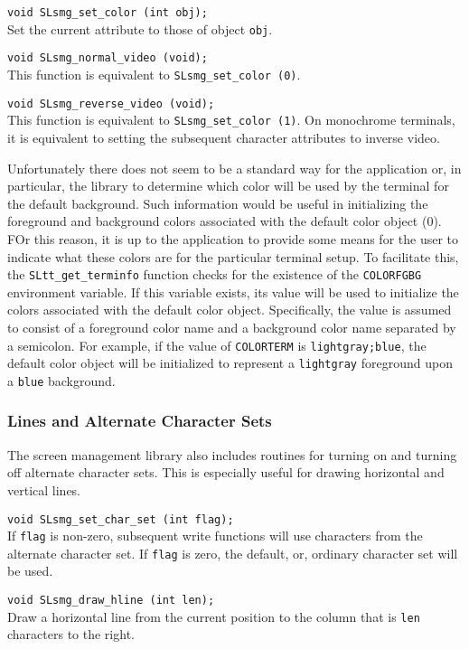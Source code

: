   \verb|void SLsmg_set_color (int obj);|\\
  Set the current attribute to those of object \verb|obj|.
  
  \verb|void SLsmg_normal_video (void);|\\
  This function is equivalent to \verb|SLsmg_set_color (0)|. 
  
  \verb|void SLsmg_reverse_video (void);|\\
  This function is equivalent to \verb|SLsmg_set_color (1)|.  On monochrome
  terminals, it is equivalent to setting the subsequent character attributes
  to inverse video.

  Unfortunately there does not seem to be a standard way for the
  application or, in particular, the library to determine which color
  will be used by the terminal for the default background.  Such
  information would be useful in initializing the foreground and
  background colors associated with the default color object (0).  FOr
  this reason, it is up to the application to provide some means for
  the user to indicate what these colors are for the particular
  terminal setup. To facilitate this, the \verb|SLtt_get_terminfo|
  function checks for the existence of the \verb|COLORFGBG|
  environment variable.  If this variable exists, its value will be
  used to initialize the colors associated with the default color
  object.  Specifically, the value is assumed to consist of a
  foreground color name and a background color name separated by a
  semicolon.  For example, if the value of \verb|COLORTERM| is
  \verb|lightgray;blue|, the default color object will be initialized
  to represent a \verb|lightgray| foreground upon a \verb|blue|
  background.

\subsubsection{Lines and Alternate Character Sets}
  The \slang{} screen management library also includes routines for turning
  on and turning off alternate character sets.  This is especially useful
  for drawing horizontal and vertical lines.
  
  \verb|void SLsmg_set_char_set (int flag);|\\
  If \verb|flag| is non-zero, subsequent write functions will use characters
  from the alternate character set.  If \verb|flag| is zero, the default, or,
  ordinary character set will be used.
  
  \verb|void SLsmg_draw_hline (int len);|\\
  Draw a horizontal line from the current position to the column that is
  \verb|len| characters to the right.
  
